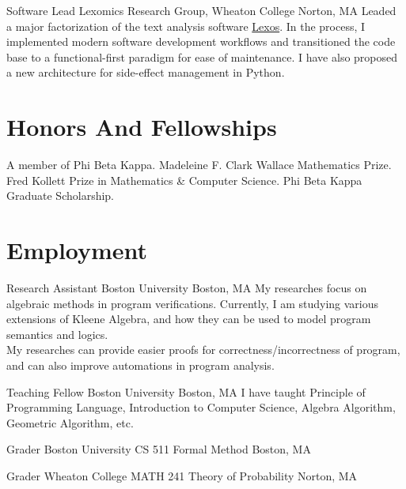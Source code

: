 \documentclass[11pt,roman]{moderncv}        %
\begin{document}
{Software Lead}
{Lexomics Research Group, Wheaton College}
{Norton, MA}{}
{
  Leaded a major factorization of the text analysis software 
  \href{https://github.com/WheatonCS/Lexos}{Lexos}.
  In the process, I implemented modern software development workflows and
  transitioned the code base to a functional-first paradigm for ease of maintenance.
  I have also proposed a new architecture for side-effect management in Python.
}


\section{Honors And Fellowships}
 {A member of Phi Beta Kappa.}
 {
  Madeleine F. Clark Wallace Mathematics Prize. \newline
  Fred Kollett Prize in Mathematics \& Computer Science. \newline
  Phi Beta Kappa Graduate Scholarship.
}


\section{Employment}

{Research Assistant}
{Boston University}
{Boston, MA}{}
{My researches focus on algebraic methods in program verifications.
Currently, I am studying various extensions of Kleene Algebra, 
and how they can be used to model program semantics and logics.\\
My researches can provide easier proofs for correctness/incorrectness of program,
and can also improve automations in program analysis.
}

{Teaching Fellow}
{Boston University}
{Boston, MA}{}
{
  I have taught Principle of Programming Language, Introduction to Computer Science,
  Algebra Algorithm, Geometric Algorithm, etc.
}

{Grader}
{Boston University CS 511 Formal Method}
{Boston, MA}{}{}

{Grader}
{Wheaton College MATH 241 Theory of Probability}
{Norton, MA}{}{}
\end{document}
